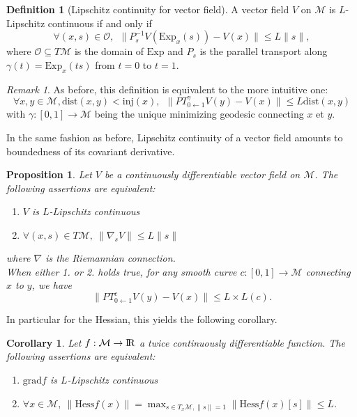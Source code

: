 \documentclass[10pt,a4paper]{book}
\theoremstyle{definition}
\newtheorem{defn}{Definition}[section]
\theoremstyle{plain}
\newtheorem{prop}{Proposition}[section]
\newtheorem{cor}{Corollary}[section]
\theoremstyle{remark}
\newtheorem{rmk}{Remark}[section]
\newcommand{\grad}{\textrm{grad}}
\newcommand \M {\mathcal{M}}
\def\R{{\rm I\kern-0.16em R}}
\begin{document}
\begin{defn}[Lipschitz continuity for vector field]
A vector field $V$ on $\M$ is $L$-Lipschitz continuous if and only if
$$\forall (x,s)\in \mathcal{O},~~\|P_s^{-1}V(\text{Exp}_x(s))-V(x)\|\leq L\|s\|,$$
where $\mathcal{O}\subseteq T\M$ is the domain of $\text{Exp}$ and $P_s$ is the parallel transport along $\gamma(t)=\text{Exp}_x(ts)$ from $t=0$ to $t=1$.
\end{defn}
\begin{rmk}
As before, this definition is equivalent to the more intuitive one:
$$\forall x,y \in \M, \text{dist}(x,y)<\text{inj}(x),~~\|PT_{0\leftarrow 1}^{\gamma}V(y)-V(x)\|\leq L\text{dist}(x,y)$$
with $\gamma:[0,1]\to \M$ being the unique minimizing geodesic connecting $x$ et $y$.
\end{rmk}
In the same fashion as before, Lipschitz continuity of a vector field amounts to boundedness of its covariant derivative.
\begin{prop}
Let $V$ be a continuously differentiable vector field on $\M$. The following assertions are equivalent:
\begin{enumerate}
\item $V$ is $L$-Lipschitz continuous
\item $\forall (x,s) \in T\M,~\|\nabla_s V \|\leq L\|s\|$
\end{enumerate}
where $\nabla$ is the Riemannian connection.\\When either 1. or 2. holds true, for any smooth curve $c:[0,1] \to \M$ connecting $x$ to $y$, we have
$$\|PT_{0\leftarrow 1}^{c}V(y)-V(x)\|\leq L\times L(c).$$
\end{prop}
In particular for the Hessian, this yields the following corollary.
\begin{cor}
Let $f:\M \to \R$ a twice continuously differentiable function. The following assertions are equivalent:
\begin{enumerate}
\item $\grad f$ is $L$-Lipschitz continuous
\item $\forall x \in \M,~\|\textrm{Hess} f(x)\|=\max_{s\in T_x\M, \|s\|=1} \|\textrm{Hess} f(x)[s]\|\leq L$.
\end{enumerate}
\end{cor}
\end{document}
